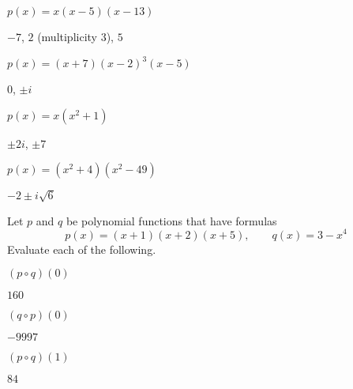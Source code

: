 \begin{exercises}
\begin{problem}
\begin{multicols}{3}
\begin{subproblem}
\begin{shortsolution}
 			$p(x)=x(x-5)(x-13)$
 		\end{shortsolution}
 	\end{subproblem}
 	\begin{subproblem}
 		$-7$, $2$ (multiplicity $3$), $5$ 
 		\begin{shortsolution}
 			$p(x)=(x+7)(x-2)^3(x-5)$
 		\end{shortsolution}
 	\end{subproblem}
 	\begin{subproblem}
 		$0$, $\pm i$ 
 		\begin{shortsolution}
 			$p(x)=x(x^2+1)$
 		\end{shortsolution}
 	\end{subproblem}
 	\begin{subproblem}
 		$\pm 2i$, $\pm 7$ 
 		\begin{shortsolution}
 			$p(x)=(x^2+4)(x^2-49)$
 		\end{shortsolution}
 	\end{subproblem}
 	\begin{subproblem}
 		$-2\pm i\sqrt{6}$ 
 	\end{subproblem}
 \end{multicols}
 \end{problem}
 \begin{problem}
 Let $p$ and $q$ be polynomial functions that have formulas
 \[
 	p(x)=(x+1)(x+2)(x+5), \qquad q(x)=3-x^4
 \]
 Evaluate each of the following.
 \begin{multicols}{4}
 	\begin{subproblem}
 		$(p\circ q)(0)$ 
 		\begin{shortsolution}
 			$160$
 		\end{shortsolution}
 	\end{subproblem}
 	\begin{subproblem}
 		$(q\circ p)(0)$ 
 		\begin{shortsolution}
 			$-9997$
 		\end{shortsolution}
 	\end{subproblem}
 	\begin{subproblem}
 		$(p\circ q)(1)$ 
 		\begin{shortsolution}
 			$84$
 		\end{shortsolution}
 	\end{subproblem}
 	\begin{subproblem}

\end{subproblem}
\end{multicols}
\end{problem}
\end{exercises}
